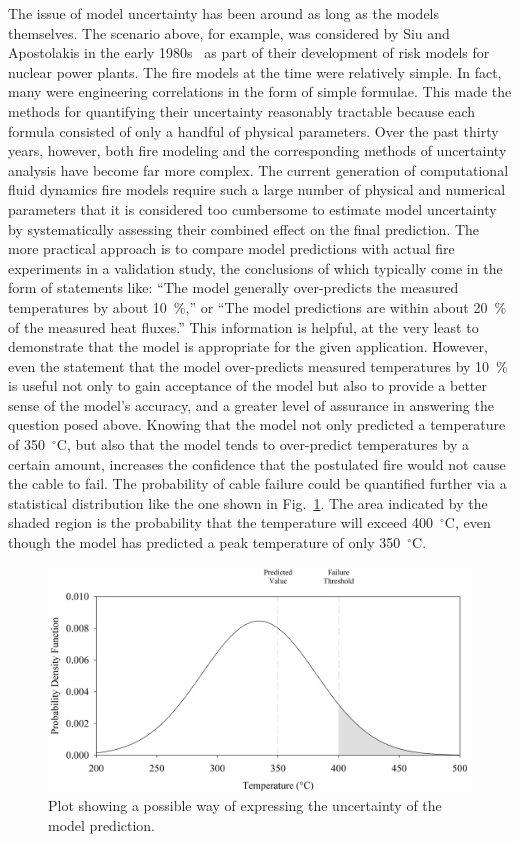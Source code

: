 The issue of model uncertainty has been around as long as the models themselves. The scenario above,
for example, was considered by Siu and Apostolakis in the early 1980s~\cite{Siu:RE1982} as part of their development of risk models for
nuclear power plants. The fire models at the
time were relatively simple. In fact, many were engineering correlations in the form of simple formulae. This made the methods for
quantifying their uncertainty reasonably tractable because each formula consisted of only a handful of physical parameters. Over the past
thirty years, however, both fire modeling and the corresponding methods of uncertainty analysis have become far more complex. The current
generation of computational fluid dynamics fire models require such a large number of physical and numerical parameters that it is considered
too cumbersome to estimate model uncertainty by systematically assessing their combined effect on the final prediction. The more
practical approach is to compare model predictions with actual fire experiments in a validation study, the conclusions of which typically come in the form of statements like:
``The model generally over-predicts the measured temperatures
by about 10~\%,'' or ``The model predictions are within about 20~\% of the measured heat fluxes.'' This information is helpful,
at the very least to demonstrate that the model is appropriate for the given application.
However, even the statement that the model over-predicts measured temperatures by 10~\% is useful not only to gain acceptance of the model but also
to provide a better sense of the model's accuracy, and a greater level of assurance in answering the question posed above. Knowing that the model
not only predicted a temperature of 350~$^\circ$C, but also that the model tends to over-predict temperatures by a certain amount, increases the confidence that
the postulated fire would not cause the cable to fail. The probability of cable failure could be quantified further via a statistical distribution
like the one shown in Fig.~\ref{bell_curve}. The area indicated by the shaded region is the probability that the temperature will exceed 400~$^\circ$C,
even though the model has predicted a peak temperature of only 350~$^\circ$C.
\begin{figure}[ht]
\begin{center}
\includegraphics[width=5.in]{FIGURES/bell_curve}
\end{center}
\caption[Demonstration of model uncertainty.]{Plot showing a possible way of expressing the uncertainty of the model prediction.}
\label{bell_curve}
\end{figure}

